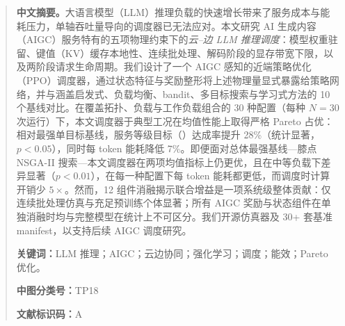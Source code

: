 
\begin{abstract}
\textbf{中文摘要。}大语言模型（LLM）推理负载的快速增长带来了服务成本与能耗压力，单轴吞吐量导向的调度器已无法应对。本文研究 AI 生成内容（AIGC）服务特有的五项物理约束下的\emph{云--边 LLM 推理调度}：模型权重驻留、键值（KV）缓存本地性、连续批处理、解码阶段的显存带宽下限，以及两阶段请求生命周期。我们设计了一个 AIGC 感知的近端策略优化（PPO）调度器，通过状态特征与奖励整形将上述物理量显式暴露给策略网络，并与涵盖启发式、负载均衡、bandit、多目标搜索与学习式方法的 10 个基线对比。在覆盖拓扑、负载与工作负载组合的 30 种配置（每种 $N{=}30$ 次运行）下，本文调度器于典型工况在均值性能上取得严格 Pareto 占优：相对最强单目标基线，服务等级目标（\slo{}）达成率提升 28\%（统计显著，$p<0.05$），同时每 token 能耗降低 7\%。即便面对总体最强基线---膝点 NSGA-II 搜索---本文调度器在两项均值指标上仍更优，且在中等负载下差异显著（$p<0.01$），在每一种配置下每 token 能耗都更低，而调度时计算开销少 $5\times$。然而，12 组件消融揭示联合增益是一项系统级整体贡献：仅连续批处理仿真与充足预训练个体显著；所有 AIGC 奖励与状态组件在单独消融时均与完整模型在统计上不可区分。我们开源仿真器及 30+ 套基准 manifest，以支持后续 AIGC 调度研究。

\textbf{关键词：}LLM 推理；AIGC；云边协同；强化学习；调度；能效；Pareto 优化。

\textbf{中图分类号：}TP18

\textbf{文献标识码：}A
\end{abstract}


